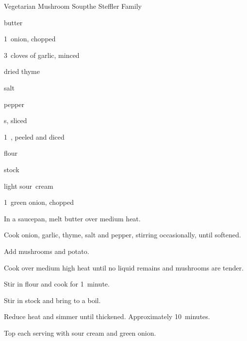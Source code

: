 \begin{recipe}{Vegetarian Mushroom Soup}{the Steffler Family}{}

\begin{ingredients}
\item {} butter
\item 1~onion, chopped
\item 3~cloves of garlic, minced
\item \tp{\half} dried thyme
\item \tp{\quarter} salt
\item \tp{\quarter} pepper
\item {} s, sliced
\item 1~, peeled and diced
\item \C{\quarter} flour
\item {} stock
\item \C{\quarter} light sour~cream
\item 1~green onion, chopped
\end{ingredients}

\begin{directions}
\item In a saucepan, melt butter over medium heat.
\item Cook onion, garlic, thyme, salt and pepper, stirring occasionally, until softened.
\item Add mushrooms and potato.
\item Cook over medium high heat until no liquid remains and mushrooms are tender.
\item Stir in flour and cook for 1~minute.
\item Stir in stock and bring to a boil.
\item Reduce heat and simmer until thickened. Approximately 10~minutes.
\item Top each serving with sour cream and green onion.
\end{directions}
\end{recipe}
